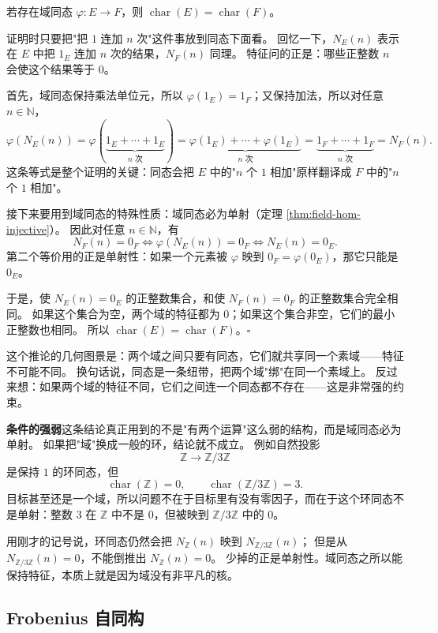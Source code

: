 \begin{corollary}[同态保持特征]\label{cor:hom-preserves-char}
若存在域同态 $\varphi: E \to F$，则 $\operatorname{char}(E) = \operatorname{char}(F)$。
\end{corollary}

证明时只要把"把 $1$ 连加 $n$ 次"这件事放到同态下面看。
回忆一下，$N_E(n)$ 表示在 $E$ 中把 $1_E$ 连加 $n$ 次的结果，$N_F(n)$ 同理。
特征问的正是：哪些正整数 $n$ 会使这个结果等于 $0$。

首先，域同态保持乘法单位元，所以 $\varphi(1_E)=1_F$；又保持加法，所以对任意 $n\in\mathbb{N}$，
\[
\varphi(N_E(n))
= \varphi(\underbrace{1_E+\cdots+1_E}_{n\text{ 次}})
= \underbrace{\varphi(1_E)+\cdots+\varphi(1_E)}_{n\text{ 次}}
= \underbrace{1_F+\cdots+1_F}_{n\text{ 次}}
= N_F(n).
\]
这条等式是整个证明的关键：同态会把 $E$ 中的"$n$ 个 $1$ 相加"原样翻译成 $F$ 中的"$n$ 个 $1$ 相加"。

接下来要用到域同态的特殊性质：域同态必为单射（定理 \ref{thm:field-hom-injective}）。
因此对任意 $n\in\mathbb{N}$，有
\[
N_F(n)=0_F
\iff \varphi(N_E(n))=0_F
\iff N_E(n)=0_E.
\]
第二个等价用的正是单射性：如果一个元素被 $\varphi$ 映到 $0_F=\varphi(0_E)$，那它只能是 $0_E$。

于是，使 $N_E(n)=0_E$ 的正整数集合，和使 $N_F(n)=0_F$ 的正整数集合完全相同。
如果这个集合为空，两个域的特征都为 $0$；如果这个集合非空，它们的最小正整数也相同。
所以 $\operatorname{char}(E)=\operatorname{char}(F)$。$\square$

这个推论的几何图景是：两个域之间只要有同态，它们就共享同一个素域——特征不可能不同。
换句话说，同态是一条纽带，把两个域"绑"在同一个素域上。
反过来想：如果两个域的特征不同，它们之间连一个同态都不存在——这是非常强的约束。

\medskip
\noindent\textbf{条件的强弱}这条结论真正用到的不是"有两个运算"这么弱的结构，而是域同态必为单射。
如果把"域"换成一般的环，结论就不成立。
例如自然投影
\[
\mathbb{Z}\longrightarrow \mathbb{Z}/3\mathbb{Z}
\]
是保持 $1$ 的环同态，但
\[
\operatorname{char}(\mathbb{Z})=0,\qquad
\operatorname{char}(\mathbb{Z}/3\mathbb{Z})=3.
\]
目标甚至还是一个域，所以问题不在于目标里有没有零因子，而在于这个环同态不是单射：整数 $3$ 在 $\mathbb{Z}$ 中不是 $0$，但被映到 $\mathbb{Z}/3\mathbb{Z}$ 中的 $0$。

用刚才的记号说，环同态仍然会把 $N_{\mathbb{Z}}(n)$ 映到 $N_{\mathbb{Z}/3\mathbb{Z}}(n)$；
但是从 $N_{\mathbb{Z}/3\mathbb{Z}}(n)=0$，不能倒推出 $N_{\mathbb{Z}}(n)=0$。
少掉的正是单射性。域同态之所以能保持特征，本质上就是因为域没有非平凡的核。

\subsection{Frobenius 自同构}

